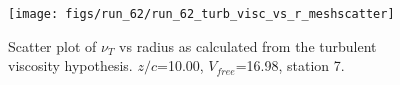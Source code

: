 \begin{figure}[H]
\centering
\texttt{[image: figs/run\_62/run\_62\_turb\_visc\_vs\_r\_meshscatter]}
\caption{Scatter plot of $\nu_T$ vs radius as calculated from the turbulent viscosity hypothesis. $z/c$=10.00, $V_{free}$=16.98, station 7.}
\label{fig:run_62_turb_visc_vs_r_meshscatter}
\end{figure}


